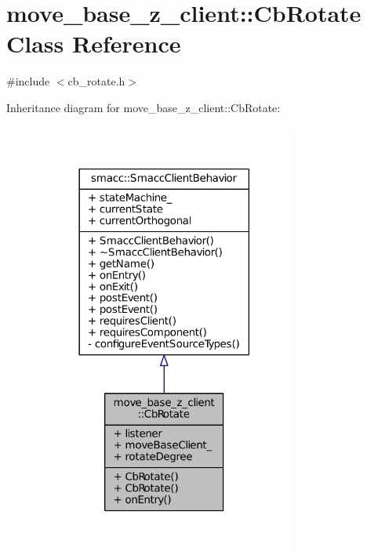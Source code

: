 \hypertarget{classmove__base__z__client_1_1CbRotate}{}\section{move\+\_\+base\+\_\+z\+\_\+client\+:\+:Cb\+Rotate Class Reference}
\label{classmove__base__z__client_1_1CbRotate}


{\ttfamily \#include $<$cb\+\_\+rotate.\+h$>$}



Inheritance diagram for move\+\_\+base\+\_\+z\+\_\+client\+:\+:Cb\+Rotate\+:
\nopagebreak
\begin{figure}[H]
\begin{center}
\leavevmode
\includegraphics[width=242pt]{classmove__base__z__client_1_1CbRotate__inherit__graph}
\end{center}
\end{figure}


